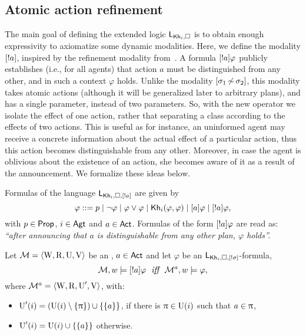 \subsection{Atomic action refinement}
\label{subsec:atom-ref}

The main goal of defining the extended logic $\mathsf{L}_{{\sf Kh}_i,\square}$ is to obtain enough expressivity to axiomatize some dynamic modalities. Here, we define the modality $[!a]$, inspired by the refinement modality from~. A formula $[!a]\varphi$ publicly establishes (i.e., for all agents) that action $a$ must be distinguished from any other, and in such a context $\varphi$ holds. Unlike the modality $[{\sigma_1{\,\not\sim\,}\sigma_2}]$, this modality takes atomic actions (although it will be generalized later to arbitrary plans), and has a single parameter, instead of two parameters. So, with the new operator we isolate the effect of one action, rather that separating a class according to the effects of two actions. This is useful as for instance, an uninformed agent may receive a concrete information about the actual effect of a particular action, thus this action becomes distinguishable from any other. Moreover, in case the agent is oblivious about the existence of an action, she becomes aware of it as a result of the announcement. We formalize these ideas below.

\medskip

\begin{definition}\label{def:ssrefsyntax}
Formulas of the language $\mathsf{L}_{{\sf Kh}_i,\square,[!a]}$ are given by
\[
\varphi ::= p \mid \neg\varphi \mid \varphi\vee\varphi \mid {\sf Kh}_i(\varphi,\varphi) \mid [a]\varphi \mid [!a]\varphi,
\]
with $p \in {\rm \sf Prop}$, $i\in{\rm \sf Agt}$ and $a \in {\rm \sf Act}$. Formulas of the form $[!a]\varphi$ are read as: \emph{``after announcing that $a$ is distinguishable from any other plan, $\varphi$ holds''.} 
\end{definition}

\medskip

\begin{definition}\label{def:ssrefsemantics}
Let $\mathcal{M} = \langle \operatorname{W}, \operatorname{R}, \operatorname{U}, \operatorname{V} \rangle$ be an \ults, $a \in {\rm \sf Act}$ and let $\varphi$ be an  $\mathsf{L}_{{\sf Kh}_i,\square,[!\sigma]}$-formula,
\[
\modults,w \models \srefbox{a}\varphi \ \ \iff \ \ \modults^a,w \models \varphi,
\] 
where $\mathcal{M}^a = \langle \operatorname{W},\operatorname{R},\operatorname{U}',\operatorname{V} \rangle$, with:
\begin{itemize}
\item $\operatorname{U}'(i) = (\operatorname{U}(i) \setminus \{ \uppi \}) \cup \{ \{ a \} \}$, if there is $\uppi \in \operatorname{U}(i)$ such that $a \in \uppi$,
\item $\operatorname{U}'(i) = \operatorname{U}(i) \cup \{ \{ a \} \}$ otherwise.
\end{itemize}
\end{definition}

